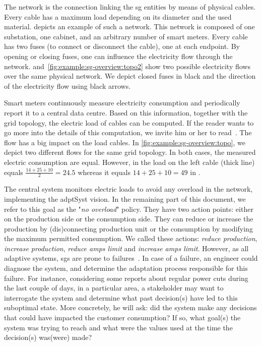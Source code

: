The network is the connection linking the \gls{sg} entities by means of physical cables. 
Every cable has a maximum load depending on its diameter and the used material.
 depicts an example of such a network. 
This network is composed of one substation, one cabinet, and an arbitrary number of smart meters.
Every cable has two fuses (to connect or disconnect the cable), one at each endpoint.
By opening or closing fuses, one can influence the electricity flow through the network.
 and~\ref{fig:example:sg-overview:topo2} show two possible electricity flows over the same physical network. 
We depict closed fuses in black and the direction of the electricity flow using black arrows.

Smart meters continuously measure electricity consumption and periodically report it to a central data centre.
Based on this information, together with the grid topology, the electric load of cables can be computed.
If the reader wants to go more into the details of this computation, we invite him or her to read~\cite{DBLP:conf/sac/0001MFRKT16}.
The flow has a big impact on the load cables.
In \autoref{fig:example:sg-overview:topo}, we depict two different flows for the same grid topology.
In both cases, the measured electric consumption are equal.
However, in  the load on the left cable (thick line) equals $\frac{14 + 25 + 10}{2} = 24.5$ whereas it equals $14+25+10=49$ in .

The central system monitors electric loads to avoid any overload in the network, implementing the \gls{adptSyst} vision.
In the remaining part of this document, we refer to this goal as the "\textit{no overload}" policy.
They have two \gls{action} points: either on the production side or the consumption side.
They can reduce or increase the production by (dis)connecting production unit or the consumption by modifying the maximum permitted consumption.
We called these actions: \textit{reduce production}, \textit{increase production}, \textit{reduce amps limit} and \textit{increase amps limit}.
However, as all adaptive systems, \gls{sg}s are prone to failures~\cite{DBLP:conf/smartgridsec/0001FKNT14}.
In case of a failure, an engineer could diagnose the system, and determine the adaptation process responsible for this failure.
For instance, considering some reports about regular power cuts during the last couple of days, in a particular area, a stakeholder may want to interrogate the system and determine what past decision(s) have led to this suboptimal state.
More concretely, he will ask: did the system make any decisions that could have impacted the customer consumption? 
If so, what goal(s) the system was trying to reach and what were the values used at the time the decision(s) was(were) made?










